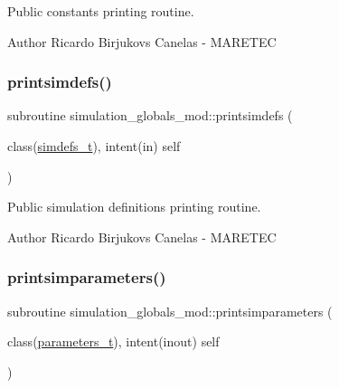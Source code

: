 Public constants printing routine. 

\begin{DoxyAuthor}{Author}
Ricardo Birjukovs Canelas -\/ M\+A\+R\+E\+T\+EC 
\end{DoxyAuthor}
\mbox{\label{namespacesimulation__globals__mod_ad331ccf019de7ed531e37c655600f90f}} 
\subsubsection{\texorpdfstring{printsimdefs()}{printsimdefs()}}
{\footnotesize\ttfamily subroutine simulation\+\_\+globals\+\_\+mod\+::printsimdefs (\begin{DoxyParamCaption}\item[{class(\hyperlink{structsimulation__globals__mod_1_1simdefs__t}{simdefs\+\_\+t}), intent(in)}]{self }\end{DoxyParamCaption})\hspace{0.3cm}{\ttfamily [private]}}



Public simulation definitions printing routine. 

\begin{DoxyAuthor}{Author}
Ricardo Birjukovs Canelas -\/ M\+A\+R\+E\+T\+EC 
\end{DoxyAuthor}
\mbox{\label{namespacesimulation__globals__mod_a97c04d0289a9f2d004a9329cb7ab16f0}} 
\subsubsection{\texorpdfstring{printsimparameters()}{printsimparameters()}}
{\footnotesize\ttfamily subroutine simulation\+\_\+globals\+\_\+mod\+::printsimparameters (\begin{DoxyParamCaption}\item[{class(\hyperlink{structsimulation__globals__mod_1_1parameters__t}{parameters\+\_\+t}), intent(inout)}]{self }\end{DoxyParamCaption})\hspace{0.3cm}{\ttfamily [private]}}



